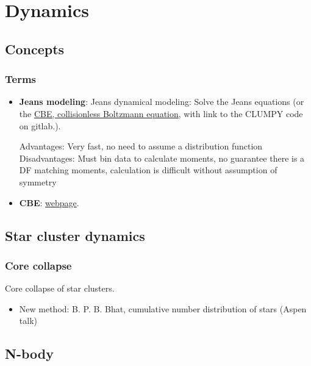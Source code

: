 \section{Dynamics}
\label{sec:org52aa5cf}

\subsection{Concepts}
\label{sec:org5efd9e6}

\subsubsection{Terms}
\label{sec:orgb31c50a}

\begin{itemize}
\item \textbf{Jeans modeling}: Jeans dynamical modeling: Solve the Jeans equations (or the \href{https://clumpy.gitlab.io/CLUMPY/physics\_jeans.html\#jeans-equation}{CBE, collisionless Boltzmann equation}, with link to the CLUMPY code on gitlab.).

  Advantages: Very fast, no need to assume a distribution function
  Disadvantages: Must bin data to calculate moments, no guarantee there is a DF matching moments, calculation is difficult without assumption of symmetry

\item \textbf{CBE}: \href{https://www.cv.nrao.edu/\~jhibbard/students/CPower/dynamics/cbe/cbe.html}{webpage}.
\end{itemize}

\subsection{Star cluster dynamics}
\label{sec:orge6a8bb8}

\subsubsection{Core collapse}
\label{sec:org17be580}

Core collapse of star clusters.
\begin{itemize}
\item New method: B. P. B. Bhat, cumulative number distribution of stars (Aspen talk)
\end{itemize}

\subsection{N-body}
\label{sec:orgc9c9551}

